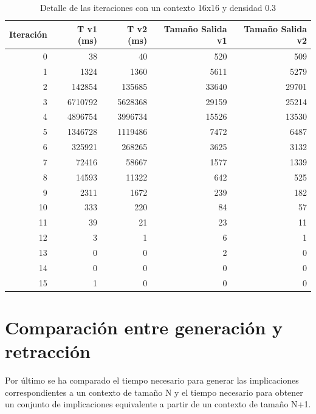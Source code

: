 	\begin{table}[htbp]
		\caption{Detalle de las iteraciones con un contexto 16x16 y densidad 0.3}
		\begin{center}
			\begin{tabular}{|r|r|r|r|r|}
				\hline
				Iteración  & T v1 (ms) & T v2 (ms) & Tamaño Salida v1  & Tamaño Salida v2  \\ \hline \hline
				0 & 38 & 40 & 520 & 509 \\ \hline
				1 & 1324 & 1360 & 5611 & 5279 \\ \hline
				2 & 142854 & 135685 & 33640 & 29701 \\ \hline
				3 & 6710792 & 5628368 & 29159 & 25214 \\ \hline
				4 & 4896754 & 3996734 & 15526 & 13530 \\ \hline
				5 & 1346728 & 1119486 & 7472 & 6487 \\ \hline
				6 & 325921 & 268265 & 3625 & 3132 \\ \hline
				7 & 72416 & 58667 & 1577 & 1339 \\ \hline
				8 & 14593 & 11322 & 642 & 525 \\ \hline
				9 & 2311 & 1672 & 239 & 182 \\ \hline
				10 & 333 & 220 & 84 & 57 \\ \hline
				11 & 39 & 21 & 23 & 11 \\ \hline
				12 & 3 & 1 & 6 & 1 \\ \hline
				13 & 0 & 0 & 2 & 0 \\ \hline
				14 & 0 & 0 & 0 & 0 \\ \hline
				15 & 1 & 0 & 0 & 0 \\ \hline
			\end{tabular}
		\end{center}
		\label{iteraciones16d3}
	\end{table}
	
		

\section*{Comparación entre generación y retracción}		
		
	Por último se ha comparado el tiempo necesario para generar las implicaciones correspondientes a un contexto de tamaño N y el tiempo necesario para obtener un conjunto de implicaciones equivalente a partir de un contexto de tamaño N+1.
	

